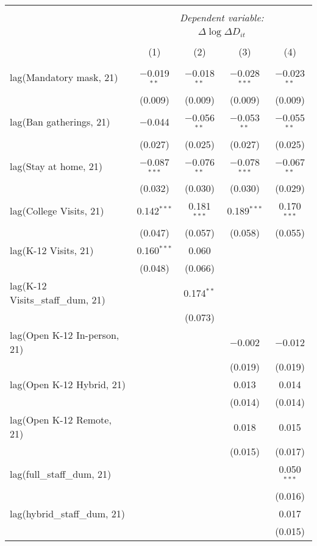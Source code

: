 \begin{tabular}{@{\extracolsep{1pt}}lcccc} 
\\[-1.8ex]\hline 
\hline \\[-1.8ex] 
 & \multicolumn{4}{c}{\textit{Dependent variable:}} \\ 
\cline{2-5} 
 & \multicolumn{4}{c}{$\Delta \log \Delta D_{it}$} \\ 
\\[-1.8ex] & (1) & (2) & (3) & (4)\\ 
\hline \\[-1.8ex] 
 lag(Mandatory mask, 21) & $-$0.019$^{**}$ & $-$0.018$^{**}$ & $-$0.028$^{***}$ & $-$0.023$^{**}$ \\ 
  & (0.009) & (0.009) & (0.009) & (0.009) \\ 
  lag(Ban gatherings, 21) & $-$0.044 & $-$0.056$^{**}$ & $-$0.053$^{**}$ & $-$0.055$^{**}$ \\ 
  & (0.027) & (0.025) & (0.027) & (0.025) \\ 
  lag(Stay at home, 21) & $-$0.087$^{***}$ & $-$0.076$^{**}$ & $-$0.078$^{***}$ & $-$0.067$^{**}$ \\ 
  & (0.032) & (0.030) & (0.030) & (0.029) \\ 
  lag(College Visits, 21) & 0.142$^{***}$ & 0.181$^{***}$ & 0.189$^{***}$ & 0.170$^{***}$ \\ 
  & (0.047) & (0.057) & (0.058) & (0.055) \\ 
  lag(K-12 Visits, 21) & 0.160$^{***}$ & 0.060 &  &  \\ 
  & (0.048) & (0.066) &  &  \\ 
  lag(K-12 Visits\_staff\_dum, 21) &  & 0.174$^{**}$ &  &  \\ 
  &  & (0.073) &  &  \\ 
  lag(Open K-12 In-person, 21) &  &  & $-$0.002 & $-$0.012 \\ 
  &  &  & (0.019) & (0.019) \\ 
  lag(Open K-12 Hybrid, 21) &  &  & 0.013 & 0.014 \\ 
  &  &  & (0.014) & (0.014) \\ 
  lag(Open K-12 Remote, 21) &  &  & 0.018 & 0.015 \\ 
  &  &  & (0.015) & (0.017) \\ 
  lag(full\_staff\_dum, 21) &  &  &  & 0.050$^{***}$ \\ 
  &  &  &  & (0.016) \\ 
  lag(hybrid\_staff\_dum, 21) &  &  &  & 0.017 \\ 
  &  &  &  & (0.015) \\ 

\end{tabular}
